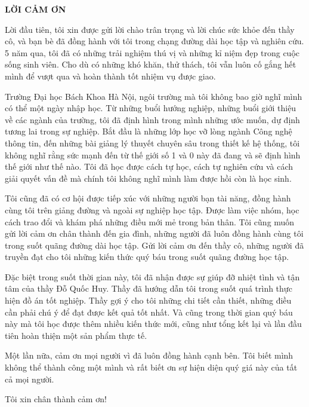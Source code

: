 \documentclass[../DoAn.tex]{subfiles}
\begin{document}
\begin{center}
    \Large{\textbf{LỜI CẢM ƠN}}\\
\end{center}
\vspace{1cm}

Lời đầu tiên, tôi xin được gửi lời chào trân trọng và lời chúc sức khỏe đến thầy cô, và bạn bè đã đồng hành với tôi trong chạng đường dài học tập và nghiên cứu. 5 năm qua, tôi đã có những trải nghiệm thú vị và những kỉ niệm đẹp trong cuộc sống sinh viên. Cho dù có những khó khăn, thử thách, tôi vẫn luôn cố gắng hết mình để vượt qua và hoàn thành tốt nhiệm vụ được giao.

Trường Đại học Bách Khoa Hà Nội, ngôi trường mà tôi không bao giờ nghĩ mình có thể một ngày nhập học. Từ những buổi hướng nghiệp, những buổi giới thiệu về các ngành của trường, tôi đã định hình trong mình những ước muốn, dự định tương lai trong sự nghiệp. Bắt đầu là những lớp học vỡ lòng ngành Công nghệ thông tin, đến những bài giảng lý thuyết chuyên sâu trong thiết kế hệ thống, tôi không nghĩ rằng sức mạnh đến từ thế giới số 1 và 0 này đã đang và sẽ định hình thế giới như thế nào. Tôi đã học được cách tự học, cách tự nghiên cứu và cách giải quyết vấn đề mà chính tôi không nghĩ mình làm được hồi còn là học sinh.

Tôi cũng đã có cơ hội được tiếp xúc với những người bạn tài năng, đồng hành cùng tôi trên giảng đường và ngoài sự nghiệp học tập. Được làm việc nhóm, học cách trao đổi và khám phá những điều mới mẻ trong bản thân. Tôi cũng muốn gửi lời cảm ơn chân thành đến gia đình, những người đã luôn đồng hành cùng tôi trong suốt quãng đường dài học tập. Gửi lời cảm ơn đến thầy cô, những người đã truyền đạt cho tôi những kiến thức quý báu trong suốt quãng đường học tập.

Đặc biệt trong suốt thời gian này, tôi đã nhận được sự giúp đỡ nhiệt tình và tận tâm của thầy Đỗ Quốc Huy. Thầy đã hướng dẫn tôi trong suốt quá trình thực hiện đồ án tốt nghiệp. Thầy gợi ý cho tôi những chi tiết cần thiết, những điều cần phải chú ý để đạt được kết quả tốt nhất. Và cũng trong thời gian quý báu này mà tôi học được thêm nhiều kiến thức mới, cũng như tổng kết lại và lần đầu tiên hoàn thiện một sản phẩm thực tế.

Một lần nữa, cảm ơn mọi người vì đã luôn đồng hành cạnh bên. Tôi biết mình không thể thành công một mình và rất biết ơn sự hiện diện quý giá này của tất cả mọi người.

\raggedleft Tôi xin chân thành cảm ơn!
\end{document}
